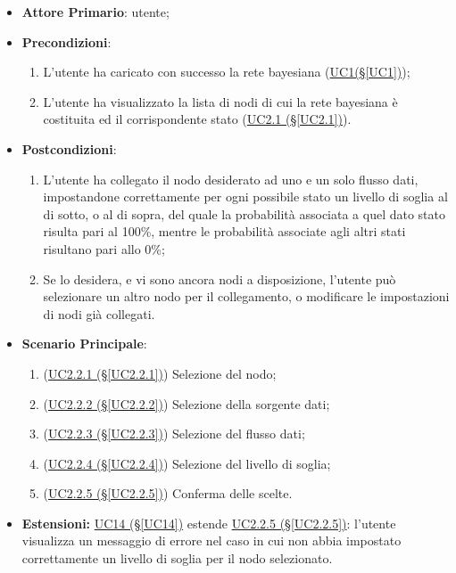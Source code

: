 \begin{itemize}
\item \textbf{Attore Primario}: utente;
\item \textbf{Precondizioni}: 
\begin{enumerate}
	\item L'utente ha caricato con successo la rete bayesiana (\hyperref[UC1]{UC1(§\ref*{UC1})});
	\item L'utente ha visualizzato la lista di nodi di cui la rete bayesiana è costituita ed il corrispondente stato 			(\hyperref[UC2.1]{UC2.1 (§\ref*{UC2.1})}).
\end{enumerate}
\item \textbf{Postcondizioni}: 
	\begin{enumerate}
	\item L'utente ha collegato il nodo desiderato ad uno e un solo flusso dati, impostandone correttamente per ogni possibile stato un livello di soglia al di sotto, o al di sopra, del quale la probabilità associata a quel dato stato risulta pari al 100\%, mentre le probabilità associate agli altri stati risultano pari allo 0\%;
	\item Se lo desidera, e vi sono ancora nodi a disposizione, l’utente può selezionare un altro nodo per il collegamento, o modificare le impostazioni di nodi già collegati.
	\end{enumerate}
\item \textbf{Scenario Principale}:
 \begin{enumerate}
 \item (\hyperref[UC2.2.1]{UC2.2.1 (§\ref*{UC2.2.1})}) Selezione del nodo;
 \item (\hyperref[UC2.2.2]{UC2.2.2 (§\ref*{UC2.2.2})}) Selezione della sorgente dati;
 \item (\hyperref[UC2.2.3]{UC2.2.3 (§\ref*{UC2.2.3})}) Selezione del flusso dati;
 \item (\hyperref[UC2.2.4]{UC2.2.4 (§\ref*{UC2.2.4})}) Selezione del livello di soglia;
 \item (\hyperref[UC2.2.5]{UC2.2.5 (§\ref*{UC2.2.5})}) Conferma delle scelte.
 \end{enumerate}
\item \textbf{Estensioni:} \hyperref[UC14]{UC14 (§\ref*{UC14})} estende \hyperref[UC2.2.5]{UC2.2.5 (§\ref*{UC2.2.5})}: l'utente visualizza un messaggio di errore nel caso in cui non abbia impostato correttamente 	un livello di soglia per il nodo selezionato.
\end{itemize}

